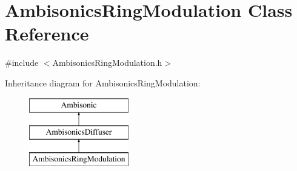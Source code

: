 \hypertarget{class_ambisonics_ring_modulation}{\section{Ambisonics\-Ring\-Modulation Class Reference}
\label{class_ambisonics_ring_modulation}
}


{\ttfamily \#include $<$Ambisonics\-Ring\-Modulation.\-h$>$}

Inheritance diagram for Ambisonics\-Ring\-Modulation\-:\begin{figure}[H]
\begin{center}
\leavevmode
\includegraphics[height=3.000000cm]{class_ambisonics_ring_modulation}
\end{center}
\end{figure}
